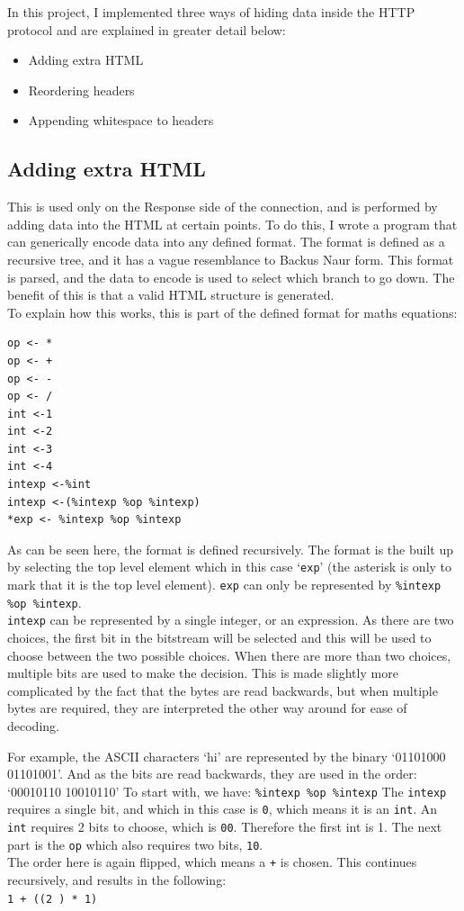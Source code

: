 \documentclass[12pt]{article}
\begin{document}
In this project, I implemented three ways of hiding data inside the HTTP protocol and are explained in greater detail below:
\begin{itemize}
    \item Adding extra HTML
    \item Reordering headers
    \item Appending whitespace to headers
\end{itemize}

\newpage

\subsection{Adding extra HTML}
This is used only on the Response side of the connection, and is performed by adding data into the HTML at certain points. To do this, I wrote a program that can generically encode data into any defined format.
The format is defined as a recursive tree, and it has a vague resemblance to Backus Naur form.
This format is parsed, and the data to encode is used to select which branch to go down.
The benefit of this is that a valid HTML structure is generated.\\
To explain how this works, this is part of the defined format for maths equations:
\begin{verbatim}
op <- *
op <- +
op <- -
op <- /
int <-1
int <-2
int <-3
int <-4
intexp <-%int
intexp <-(%intexp %op %intexp)
*exp <- %intexp %op %intexp
\end{verbatim}
As can be seen here, the format is defined recursively.
The format is the built up by selecting the top level element which in this case `\texttt{exp}' (the asterisk is only to mark that it is the top level element).
\texttt{exp} can only be represented by \texttt{\%intexp \%op \%intexp}. \\
\texttt{intexp} can be represented by a single integer, or an expression.
As there are two choices, the first bit in the bitstream will be selected and this will be used to choose between the two possible choices.
When there are more than two choices, multiple bits are used to make the decision.
This is made slightly more complicated by the fact that the bytes are read backwards, but when multiple bytes are required, they are interpreted the other way around for ease of decoding.

For example, the ASCII characters `hi' are represented by the binary `01101000 01101001'.
And as the bits are read backwards, they are used in the order: `00010110 10010110'
To start with, we have:
\texttt{\%intexp \%op \%intexp}
The \texttt{intexp} requires a single bit, and which in this case is \texttt{0}, which means it is an \texttt{int}. An \texttt{int} requires 2 bits to choose, which is \texttt{00}.
Therefore the first int is 1. The next part is the \texttt{op} which also requires two bits, \texttt{10}.\\
The order here is again flipped, which means a \texttt{+} is chosen.
This continues recursively, and results in the following: \\
\texttt{1 + ((2 ) * 1)}
\newpage
\end{document}
